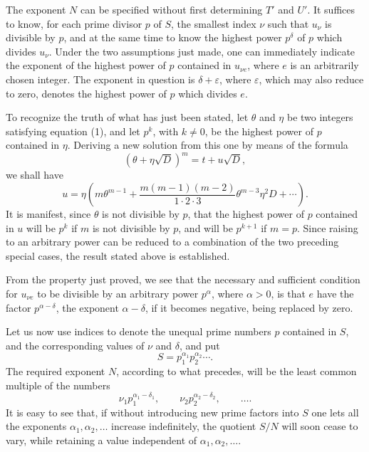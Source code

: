 \documentclass[11pt]{article}
\begin{document}
The exponent \(N\) can be specified without first determining \(T'\) and \(U'\). It suffices to know, for each prime divisor \(p\) of \(S\), the smallest index \(\nu\) such that \(u_\nu\) is divisible by \(p\), and at the same time to know the highest power \(p^\delta\) of \(p\) which divides \(u_\nu\). Under the two assumptions just made, one can immediately indicate the exponent of the highest power of \(p\) contained in \(u_{\nu e}\), where \(e\) is an arbitrarily chosen integer. The exponent in question is \(\delta+\varepsilon\), where \(\varepsilon\), which may also reduce to zero, denotes the highest power of \(p\) which divides \(e\).

To recognize the truth of what has just been stated, let \(\theta\) and \(\eta\) be two integers satisfying equation (1), and let \(p^k\), with \(k\ne0\), be the highest power of \(p\) contained in \(\eta\). Deriving a new solution from this one by means of the formula
\[
(\theta+\eta\sqrt D)^m=t+u\sqrt D,
\]
we shall have
\[
u=\eta\left(m\theta^{m-1}
+\frac{m(m-1)(m-2)}{1\cdot2\cdot3}\theta^{m-3}\eta^2D+\cdots\right).
\]
It is manifest, since \(\theta\) is not divisible by \(p\), that the highest power of \(p\) contained in \(u\) will be \(p^k\) if \(m\) is not divisible by \(p\), and will be \(p^{k+1}\) if \(m=p\). Since raising to an arbitrary power can be reduced to a combination of the two preceding special cases, the result stated above is established.

From the property just proved, we see that the necessary and sufficient condition for \(u_{\nu e}\) to be divisible by an arbitrary power \(p^\alpha\), where \(\alpha>0\), is that \(e\) have the factor \(p^{\alpha-\delta}\), the exponent \(\alpha-\delta\), if it becomes negative, being replaced by zero.

Let us now use indices to denote the unequal prime numbers \(p\) contained in \(S\), and the corresponding values of \(\nu\) and \(\delta\), and put
\[
S=p_1^{\alpha_1}p_2^{\alpha_2}\cdots.
\]
The required exponent \(N\), according to what precedes, will be the least common multiple of the numbers
\[
\nu_1p_1^{\alpha_1-\delta_1},\qquad
\nu_2p_2^{\alpha_2-\delta_2},\qquad \ldots .
\]
It is easy to see that, if without introducing new prime factors into \(S\) one lets all the exponents \(\alpha_1,\alpha_2,\ldots\) increase indefinitely, the quotient \(S/N\) will soon cease to vary, while retaining a value independent of \(\alpha_1,\alpha_2,\ldots\).
\end{document}
